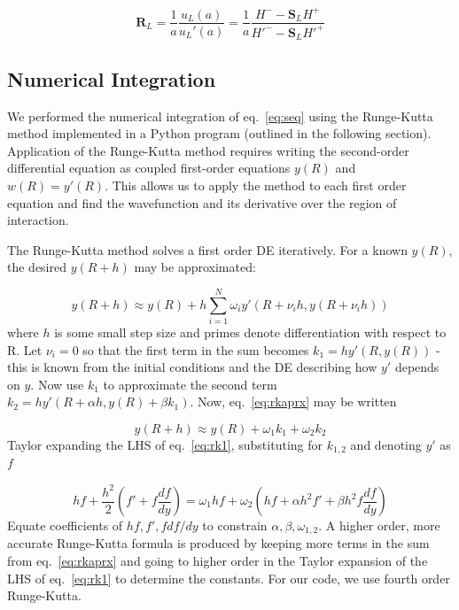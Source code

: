 \documentclass[]{scrartcl}
\begin{document}
\begin{equation}
	\mathbf{R}_L = \frac{1}{a} \frac{u _L (a)}{u _L ' (a)} = \frac{1}{a} \frac{H^- - \mathbf{S}_L H^+}{H'^- - \mathbf{S}_L H' ^+}
	\label{eq:rmtx}
\end{equation}

\subsection*{Numerical Integration}

We performed the numerical integration of eq.~\ref{eq:seq} using the Runge-Kutta method implemented in a Python program (outlined in the following section). Application of the Runge-Kutta method requires writing the second-order differential equation as coupled first-order equations $y(R)$ and $w(R) = y'(R)$. This allows us to apply the method to each first order equation and find the wavefunction and its derivative over the region of interaction.

The Runge-Kutta method solves a first order DE iteratively. For a known $y(R)$, the desired $y(R+h)$ may be approximated:

\begin{equation}
	y(R+h) \approx y(R) + h \sum_{i=1}^N \omega_i y'(R + \nu_i h,y(R + \nu_ih))
	\label{eq:rkaprx}
\end{equation}
where $h$ is some small step size and primes denote differentiation with respect to R. Let $\nu_i =0$ so that the first term in the sum becomes $k_1 = h y' (R,y(R))$ - this is known from the initial conditions and the DE describing how $y'$ depends on $y$. Now use $k_1$ to approximate the second term $k_2 = h y' (R+\alpha h, y(R) + \beta k_1)$. Now, eq.~\ref{eq:rkaprx} may be written

\begin{equation}
	y(R+h) \approx y(R) + \omega_1 k_1 + \omega_2 k_2
	\label{eq:rk1}
\end{equation}
Taylor expanding the LHS of eq.~\ref{eq:rk1}, substituting for $k_{1,2}$ and denoting $y'$ as $f$

\begin{equation}
	hf + \frac{h^2}{2} \left ( f' + f \frac{df}{dy} \right ) = \omega_1 hf + \omega_2 \left  ( hf + \alpha h^2 f' + \beta h^2 f \frac{df}{dy} \right )
	\label{eq:rk2}
\end{equation}
Equate coefficients of $hf,f',f df/dy$ to constrain $\alpha, \beta, \omega_{1,2}$. A higher order, more accurate Runge-Kutta formula is produced by keeping more terms in the sum from eq.~\ref{eq:rkaprx} and going to higher order in the Taylor expansion of the LHS of eq.~\ref{eq:rk1} to determine the constants. For our code, we use fourth order Runge-Kutta.
\end{document}
